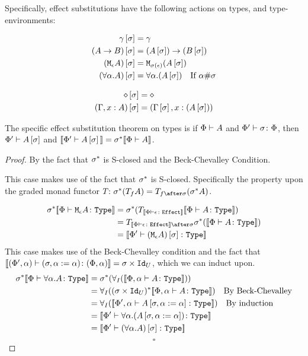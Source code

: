 \documentclass{Report}
\begin{document}
Specifically, effect substitutions have the following actions on types, and type-environments:

\begin{align*}
    \gamma\left[\sigma\right] &= \gamma \\
    (A\rightarrow B)\left[\sigma\right] &= (A\left[\sigma\right])\rightarrow (B\left[\sigma\right]) \\
    (\texttt{M}_{\epsilon}{A})\left[\sigma\right] &= \texttt{M}_{\sigma(\epsilon)}{(A\left[\sigma\right])}\\
    (\forall \alpha. A)\left[\sigma\right] &= \forall \alpha. (A\left[\sigma\right])\quad\text{If $\alpha\#\sigma$}
\end{align*}

\begin{align*}
    \diamond\left[\sigma\right] & = \diamond \\
    (\Gamma, x: A)\left[\sigma\right] &= (\Gamma\left[\sigma\right], x:(A\left[\sigma\right]))\\
\end{align*}


\begin{theorem}
    The specific effect substitution theorem on types is if $\Phi\vdash A$ and $\Phi' \vdash \sigma \colon \Phi$, then $\Phi'\vdash A\left[\sigma\right]$ and ${\bf [\![}\Phi'\vdash A\left[\sigma\right]{\bf ]\!]} = \sigma^*{\bf [\![}\Phi\vdash A{\bf ]\!]}$.
\end{theorem}

\begin{proof}
   By the fact that $\sigma^*$ is S-closed and the Beck-Chevalley Condition.

    This case makes use of the fact that $\sigma^*$ is S-closed. Specifically the property upon the graded monad functor $T_{}{}$: $\si\star(\T{f}{A}) = \T{f\after\si}{(\si\star A)}$.


    \begin{align}
        \si\star\deno{\typerelation{\P}{\mea}{\type}} & =  \si\star(\T{\deno{\typerelation{\P}{\e}{\effect}}}{\deno{\typerelation{\P}{A}{\type}}})\\
        &= \T{\deno{\typerelation{\P}{\e}{\effect}}\after\si}{\si\star(\deno{\typerelation{\P}{A}{\type}})}\\
        & = \deno{\typerelation{\P'}{(\mea)\ssi}{\type}}
    \end{align}
    This case makes use of the Beck-Chevalley condition and the fact that ${\bf [\![}(\Phi', \alpha) \vdash (\sigma, \alpha:=\alpha) \colon (\Phi, \alpha){\bf ]\!]} = \sigma\times\texttt{Id}_{U}$, which we can induct upon.
        \begin{align}
            \si\star\deno{\typerelation{\P}{\all{\a}A}{\type}} & = \si\star(\allI(\deno{\typerelation{\P,\a}{A}{\type}}))\\
            & = \allI((\si\times\Id{U})\star\deno{\typerelation{\P,\a}{A}{\type}})\qt{By Beck-Chevalley}\\
            & = \allI(\deno{\typerelation{\P',\a}{A\sub{\si, \a\setto\a}}{\type}})\qt{By induction}\\
            & = \deno{\typerelation{\P'}{\all{\a}{(A\sub{\si, \a\setto\a})}}{\type}}\\
            & = \deno{\typerelation{\P'}{(\all{\a}{A})\ssi}{\type}}\\
        \end{align}
        $$\square$$
\end{proof}
\end{document}
